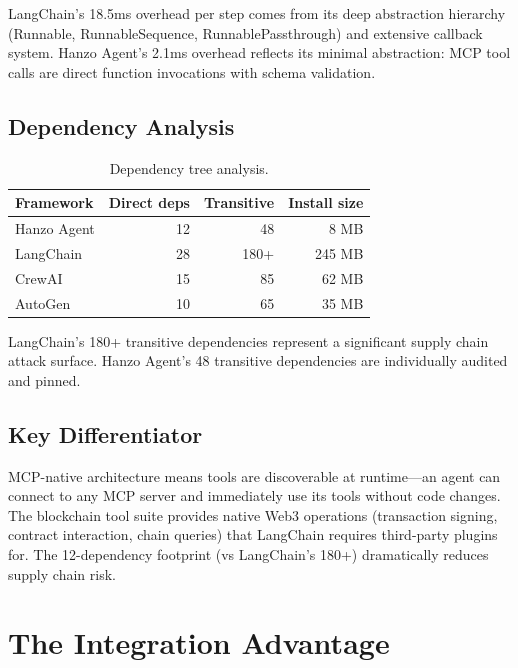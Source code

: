\documentclass[11pt,twocolumn]{article}
\begin{document}
LangChain's 18.5ms overhead per step comes from its deep abstraction hierarchy (Runnable, RunnableSequence, RunnablePassthrough) and extensive callback system. Hanzo Agent's 2.1ms overhead reflects its minimal abstraction: MCP tool calls are direct function invocations with schema validation.

\subsection{Dependency Analysis}

\begin{table}[H]
\centering
\caption{Dependency tree analysis.}
\footnotesize
\begin{tabular}{@{}lrrr@{}}
\toprule
Framework & Direct deps & Transitive & Install size \\
\midrule
Hanzo Agent & 12 & 48 & 8 MB \\
LangChain & 28 & 180+ & 245 MB \\
CrewAI & 15 & 85 & 62 MB \\
AutoGen & 10 & 65 & 35 MB \\
\bottomrule
\end{tabular}
\end{table}

LangChain's 180+ transitive dependencies represent a significant supply chain attack surface. Hanzo Agent's 48 transitive dependencies are individually audited and pinned.

\subsection{Key Differentiator}

MCP-native architecture means tools are discoverable at runtime---an agent can connect to any MCP server and immediately use its tools without code changes. The blockchain tool suite provides native Web3 operations (transaction signing, contract interaction, chain queries) that LangChain requires third-party plugins for. The 12-dependency footprint (vs LangChain's 180+) dramatically reduces supply chain risk.

\section{The Integration Advantage}
\label{sec:integrated}
\end{document}
